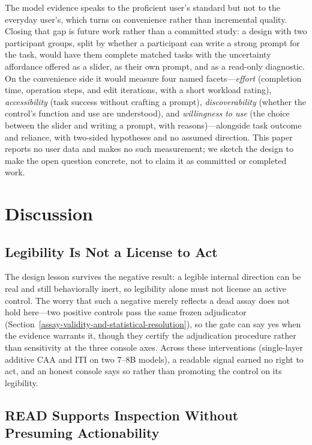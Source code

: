 \documentclass[manuscript,review,anonymous]{acmart}
\begin{document}
The model evidence speaks to the proficient user's standard but not to the everyday user's, which turns on convenience rather than incremental quality. Closing that gap is future work rather than a committed study: a design with two participant groups, split by whether a participant can write a strong prompt for the task, would have them complete matched tasks with the uncertainty affordance offered as a slider, as their own prompt, and as a read-only diagnostic. On the convenience side it would measure four named facets---\emph{effort} (completion time, operation steps, and edit iterations, with a short workload rating), \emph{accessibility} (task success without crafting a prompt), \emph{discoverability} (whether the control's function and use are understood), and \emph{willingness to use} (the choice between the slider and writing a prompt, with reasons)---alongside task outcome and reliance, with two-sided hypotheses and no assumed direction. This paper reports no user data and makes no such measurement; we sketch the design to make the open question concrete, not to claim it as committed or completed work.

\section{Discussion}\label{discussion}

\subsection{Legibility Is Not a License to Act}\label{an-honest-negative-not-a-blind-assay}

The design lesson survives the negative result: a legible internal direction can be real and still behaviorally inert, so legibility alone must not license an active control. The worry that such a negative merely reflects a dead assay does not hold here---two positive controls pass the same frozen adjudicator (Section~\ref{assay-validity-and-statistical-resolution}), so the gate can say yes when the evidence warrants it, though they certify the adjudication procedure rather than sensitivity at the three console axes. Across these interventions (single-layer additive CAA and ITI on two 7--8B models), a readable signal earned no right to act, and an honest console says so rather than promoting the control on its legibility.

\subsection{READ Supports Inspection Without Presuming Actionability}\label{read-supports-inspection-without-presuming-actionability}
\end{document}
